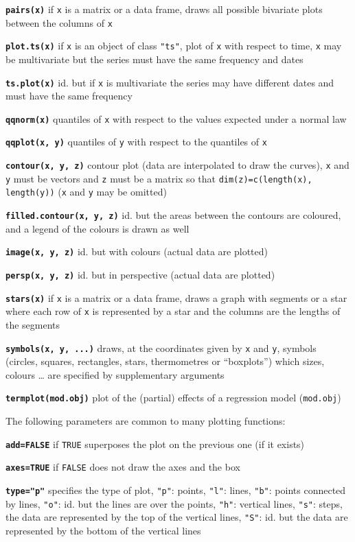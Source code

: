 \documentclass[10pt,landscape]{article}
\newcommand{\code}{\texttt}
\newcommand{\bcode}[1]{\texttt{\textbf{#1}}}
\newcommand\F{\code{FALSE}}
\newcommand\T{\code{TRUE}}
\begin{document}
\begin{multicols*}{3}
\bcode{pairs(x)}  if \code{x} is a matrix or a data frame, draws all possible bivariate plots between the columns of \code{x}

\bcode{plot.ts(x)}  if \code{x} is an object of class \code{"ts"}, plot of \code{x} with respect to time, \code{x}  may be multivariate but the series must have the same frequency and dates

\bcode{ts.plot(x)}  id. but if \code{x} is multivariate the series may have different dates and must have the same frequency

\bcode{qqnorm(x)}  quantiles of \code{x} with respect to the values expected under a normal law

\bcode{qqplot(x, y)}  quantiles of \code{y} with respect to the quantiles of \code{x}

\bcode{contour(x, y, z)}  contour plot (data are interpolated to draw the curves), \code{x} and \code{y} must be vectors and \code{z} must be a matrix so that \code{dim(z)=c(length(x), length(y))} (\code{x} and \code{y} may be omitted)

\bcode{filled.contour(x, y, z)}  id. but the areas between the contours are coloured, and a legend of the colours is drawn as well

\bcode{image(x, y, z)}  id. but with colours (actual data are plotted)

\bcode{persp(x, y, z)}  id. but in perspective (actual data are plotted)

\bcode{stars(x)}  if \code{x} is a matrix or a data frame, draws a graph with segments or a star where each row of \code{x} is represented by a star and the columns are the lengths of the segments

\bcode{symbols(x, y, ...)}  draws, at the coordinates given by \code{x} and \code{y}, symbols (circles, squares, rectangles, stars, thermometres or ``boxplots'') which sizes, colours \ldots{} are specified by supplementary arguments

\bcode{termplot(mod.obj)}  plot of the (partial) effects of a regression model (\code{mod.obj})

The following parameters are common to many plotting functions:

\bcode{add=FALSE}  if \T{} superposes the plot on the previous one (if it exists)

\bcode{axes=TRUE}  if \F{} does not draw the axes and the box

\bcode{type="p"}  specifies the type of plot, \code{"p"}: points, \code{"l"}: lines, \code{"b"}: points connected by lines, \code{"o"}: id. but the lines are over the points, \code{"h"}: vertical lines, \code{"s"}: steps, the data are represented by the top of the vertical lines, \code{"S"}: id. but the data are represented by the bottom of the vertical lines


\end{multicols*}
\end{document}
